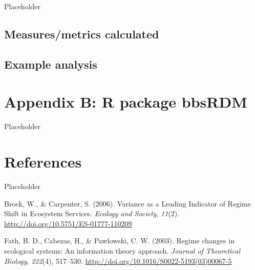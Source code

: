 \documentclass[12pt,twoside,openany]{reedthesis}
\begin{document}
Placeholder

\section{Measures/metrics calculated}\label{measuresmetrics-calculated}

\section{Example analysis}\label{example-analysis}

\chapter*{Appendix B: R package bbsRDM}\label{bbsRDM}

Placeholder

\chapter*{References}\label{references}

Placeholder

\hypertarget{refs}{}
\hypertarget{ref-brock_variance_2006}{}
Brock, W., \& Carpenter, S. (2006). Variance as a Leading Indicator of
Regime Shift in Ecosystem Services. \emph{Ecology and Society},
\emph{11}(2). \url{http://doi.org/10.5751/ES-01777-110209}

\hypertarget{ref-fath_regime_2003}{}
Fath, B. D., Cabezas, H., \& Pawlowski, C. W. (2003). Regime changes in
ecological systems: An information theory approach. \emph{Journal of
Theoretical Biology}, \emph{222}(4), 517--530.
\url{http://doi.org/10.1016/S0022-5193(03)00067-5}
\end{document}
